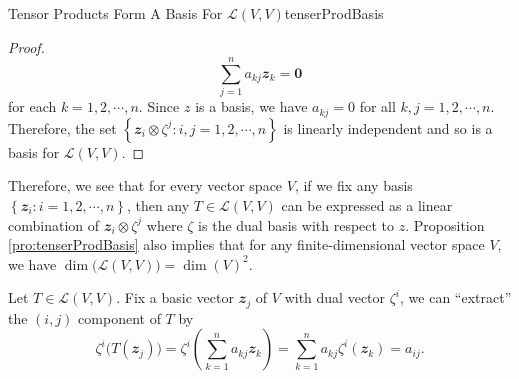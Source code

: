 \documentclass[math, code]{amznotes}
\theoremstyle{remark}
\newcommand{\zero}{\mathbf{0}}
\begin{document}
\begin{probox}{Tensor Products Form A Basis For $\mathcal{L}(V, V)$}{tenserProdBasis}
\begin{proof}
        \begin{equation*}
            \sum_{j = 1}^{n}a_{kj}\mathbfit{z}_k = \zero
        \end{equation*}
        for each $k = 1, 2, \cdots, n$. Since $z$ is a basis, we have $a_{kj} = 0$ for all $k, j = 1, 2, \cdots, n$. Therefore, the set $\left\{\mathbfit{z}_i \otimes \zeta^j \colon i, j = 1, 2, \cdots, n\right\}$
        is linearly independent and so is a basis for $\mathcal{L}(V, V)$.
    \end{proof}
\end{probox}
Therefore, we see that for every vector space $V$, if we fix any basis $\left\{\mathbfit{z}_i \colon i = 1, 2, \cdots, n\right\}$, then any $T \in \mathcal{L}(V, V)$ can be expressed as a linear combination of $\mathbfit{z}_i \otimes \zeta^j$ where $\zeta$ is the dual basis with respect to $z$. Proposition \ref{pro:tenserProdBasis} also implies that for any finite-dimensional vector space $V$, we have $\dim\bigl(\mathcal{L}(V, V)\bigr) = \dim(V)^2$.

Let $T \in \mathcal{L}(V, V)$. Fix a basic vector $\mathbfit{z}_j$ of $V$ with dual vector $\zeta^i$, we can ``extract'' the $(i, j)$ component of $T$ by
\begin{equation*}
    \zeta^i\bigl(T(\mathbfit{z}_j)\bigr) = \zeta^i\left(\sum_{k = 1}^{n}a_{kj}\mathbfit{z}_k\right) = \sum_{k = 1}^{n}a_{kj}\zeta^i(\mathbfit{z}_k) = a_{ij}.
\end{equation*}
\end{document}
